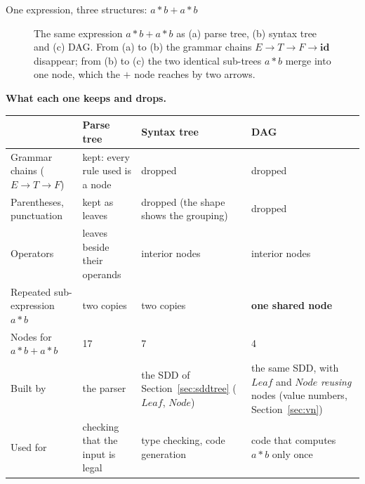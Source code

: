 \documentclass[11pt,a4paper]{article}
\begin{document}
\begin{examplebox}{One expression, three structures: $a*b + a*b$}
\begin{figure}[H]
{}
\caption{The same expression $a*b+a*b$ as (a) parse tree, (b) syntax tree and (c) DAG. From (a) to (b) the grammar chains $E\to T\to F\to\mathbf{id}$ disappear; from (b) to (c) the two identical sub-trees $a*b$ merge into one node, which the $+$ node reaches by two arrows.}
\label{fig:threetrees}
\end{figure}

\textbf{What each one keeps and drops.}
\begin{center}
\small
\begin{tabular}{@{}p{3.3cm} p{2.9cm} p{3.1cm} p{3.6cm}@{}}
\toprule
 & \textbf{Parse tree} & \textbf{Syntax tree} & \textbf{DAG} \\ \midrule
Grammar chains ($E\to T\to F$) & kept: every rule used is a node & dropped & dropped \\
Parentheses, punctuation & kept as leaves & dropped (the shape shows the grouping) & dropped \\
Operators & leaves beside their operands & interior nodes & interior nodes \\
Repeated sub-expression $a*b$ & two copies & two copies & \textbf{one shared node} \\
Nodes for $a*b+a*b$ & 17 & 7 & 4 \\
Built by & the parser & the SDD of Section~\ref{sec:sddtree} ($\mathit{Leaf}$, $\mathit{Node}$) & the same SDD, with $\mathit{Leaf}$ and $\mathit{Node}$ \emph{reusing} nodes (value numbers, Section~\ref{sec:vn}) \\
Used for & checking that the input is legal & type checking, code generation & code that computes $a*b$ only once \\ \bottomrule
\end{tabular}
\end{center}


\end{examplebox}
\end{document}
